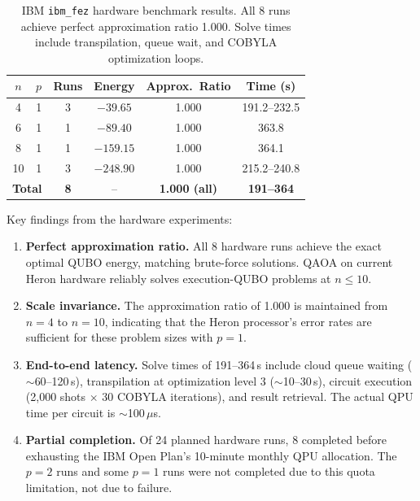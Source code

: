 \documentclass[11pt]{article}
\begin{document}
\begin{table}[t]
\centering
\caption{IBM \texttt{ibm\_fez} hardware benchmark results. All 8 runs achieve perfect approximation ratio 1.000. Solve times include transpilation, queue wait, and COBYLA optimization loops.}
\label{tab:hw_results}
\begin{tabular}{@{}cccccc@{}}
\toprule
\textbf{$n$} & \textbf{$p$} & \textbf{Runs} & \textbf{Energy} & \textbf{Approx.\ Ratio} & \textbf{Time (s)} \\
\midrule
4  & 1 & 3 & $-39.65$ & 1.000 & 191.2--232.5 \\
6  & 1 & 1 & $-89.40$ & 1.000 & 363.8 \\
8  & 1 & 1 & $-159.15$ & 1.000 & 364.1 \\
10 & 1 & 3 & $-248.90$ & 1.000 & 215.2--240.8 \\
\midrule
\multicolumn{2}{c}{\textbf{Total}} & \textbf{8} & -- & \textbf{1.000 (all)} & \textbf{191--364} \\
\bottomrule
\end{tabular}
\end{table}

Key findings from the hardware experiments:

\begin{enumerate}[leftmargin=*]
\item \textbf{Perfect approximation ratio.} All 8 hardware runs achieve the exact optimal QUBO energy, matching brute-force solutions. QAOA on current Heron hardware reliably solves execution-QUBO problems at $n \leq 10$.

\item \textbf{Scale invariance.} The approximation ratio of 1.000 is maintained from $n=4$ to $n=10$, indicating that the Heron processor's error rates are sufficient for these problem sizes with $p=1$.

\item \textbf{End-to-end latency.} Solve times of 191--364\,s include cloud queue waiting ($\sim$60--120\,s), transpilation at optimization level 3 ($\sim$10--30\,s), circuit execution (2,000 shots $\times$ 30 COBYLA iterations), and result retrieval. The actual QPU time per circuit is $\sim$100\,$\mu$s.

\item \textbf{Partial completion.} Of 24 planned hardware runs, 8 completed before exhausting the IBM Open Plan's 10-minute monthly QPU allocation. The $p=2$ runs and some $p=1$ runs were not completed due to this quota limitation, not due to failure.
\end{enumerate}
\end{document}
